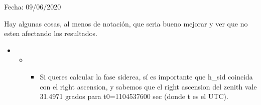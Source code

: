 Fecha: 09/06/2020

Hay algunas cosas, al menos de notación, que  seria bueno mejorar y ver que no esten afectando los resultados.

\begin{itemize}
	\item

	\begin{itemize}


		\item

			\begin{itemize}

				\done la frecuencia solar equivale a $\sim$ 365,25 ciclos por año, y el periodo es la duracion de cada ciclo, y siempre se denoto con T, asi que seria mas correcto definir la coordenada angular asociada a cada frecuencia f\_x (sol, sid, antisid,..., con periodo T\_x), medida por ejemplo en horas,  como 

				$h_x= 24 \frac{t-t_0}{T_x} + h_x(t_0)$

				(en tu ecuacion parece estar al reves, o sea $T_x$ multiplicando, fijate si esta bien en el programa)

				\done  para el grafico de las amplitudes para distintas frecuencias no importa el valor de $h_x(t_0)$, solo que tiene que ser consistente el valor para los hexagonos y los eventos, asi que ahi eventualmente podes tomar simplemente$ h_x=24  t/T_x$  (si queres el resultado en horas, yo te aconsejaria ponerlo directamente en radianes para el analisis de Fourier, reemplazando 24 por 2 pi)

				\item Si queres calcular la fase siderea, sí es importante que h\_sid coincida con el right ascension, y sabemos que el right ascension del zenith vale  31.4971 grados para t0=1104537600 sec  (donde t es el UTC).


\end{itemize}
\end{itemize}
\end{itemize}
